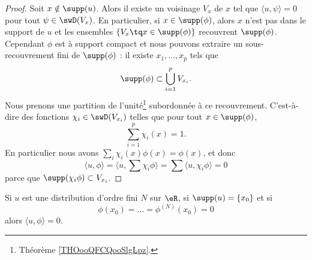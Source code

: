 \begin{proof}
    Soit \( x\notin\supp(u)\). Alors il existe un voisinage \( V_x\) de \( x\) tel que \( \langle u, \psi\rangle =0\) pour tout \( \psi\in\swD(V_x)\). En particulier, si \( x\in\supp(\phi)\), alors \( x\) n'est pas dans le support de \( u\) et les ensembles \( \{ V_x\tq x\in\supp(\phi) \}\) recouvrent \( \supp(\phi)\). Cependant \( \phi\) est à support compact et nous pouvons extraire un sous-recouvrement fini de \( \supp(\phi)\) : il existe \( x_1,\ldots, x_p\) tels que
    \begin{equation}
        \supp(\phi)\subset\bigcup_{i=1}^pV_{x_i}.
    \end{equation}
    Nous prenons une partition de l'unité\footnote{Théorème \ref{THOooQFCQooSlgLpz}.} subordonnée à ce recouvrement. C'est-à-dire des fonctions \( \chi_i\in\swD(V_{x_i})\) telles que pour tout \( x\in\supp(\phi)\),
    \begin{equation}
        \sum_{i=1}^p\chi_i(x)=1.
    \end{equation}
    En particulier nous avons \( \sum_i\chi_i(x)\phi(x)=\phi(x)\), et donc
    \begin{equation}
        \langle u, \phi\rangle =\langle u, \sum \chi_i\phi\rangle =\sum\langle u, \chi_i\phi\rangle =0
    \end{equation}
    parce que \( \supp(\chi_i\phi)\subset V_{x_i}\).
\end{proof}

\begin{lemma}
    Si \( u\) est une distribution d'ordre fini \( N\) sur \( \eR\), si \( \supp(u)=\{ x_0 \}\) et si
    \begin{equation}
        \phi(x_0)=\ldots=\phi^{(N)}(x_0)=0
    \end{equation}
    alors \( \langle u, \phi\rangle =0\).
\end{lemma}

